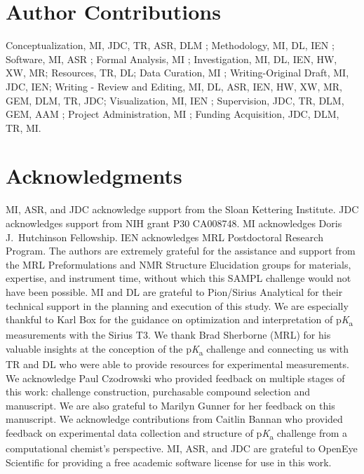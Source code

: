 \documentclass[9pt,lineno]{elife}
\newcommand{\pKa}{p\textit{K}\textsubscript{a}}
\begin{document}
\section{Author Contributions}

Conceptualization, MI, JDC, TR, ASR, DLM  ; Methodology, MI, DL, IEN ; Software, MI, ASR ; Formal Analysis, MI ; Investigation, MI, DL, IEN, HW, XW, MR; Resources, TR, DL;  Data Curation, MI ; Writing-Original Draft, MI, JDC, IEN; Writing - Review and Editing, MI, DL, ASR, IEN, HW, XW, MR, GEM, DLM, TR, JDC; Visualization, MI, IEN ; Supervision, JDC, TR, DLM, GEM, AAM ; Project Administration, MI ; Funding Acquisition, JDC, DLM, TR, MI. 


\section{Acknowledgments}

MI, ASR, and JDC acknowledge support from the Sloan Kettering Institute.
JDC acknowledges support from NIH grant P30 CA008748. 
MI acknowledges Doris J.\ Hutchinson Fellowship. IEN acknowledges MRL Postdoctoral Research Program.
The authors are extremely grateful for the assistance and support from the MRL Preformulations and NMR Structure Elucidation groups for materials, expertise, and instrument time, without which this SAMPL challenge would not have been possible.
MI and DL are grateful to Pion/Sirius Analytical for their technical support in the planning and execution of this study. We are especially thankful to Karl Box for the guidance on optimization and interpretation of \pKa{} measurements with the Sirius T3. 
We thank Brad Sherborne (MRL) for his valuable insights at the conception of the \pKa{} challenge and connecting us with TR and DL who were able to provide resources for experimental measurements. 
We acknowledge Paul Czodrowski who provided feedback on multiple stages of this work: challenge construction, purchasable compound selection and manuscript. 
We are also grateful to Marilyn Gunner for her feedback on this manuscript.
We acknowledge contributions from Caitlin Bannan who provided feedback on experimental data collection and structure of \pKa{} challenge from a computational chemist's perspective. 
MI, ASR, and JDC are grateful to OpenEye Scientific for providing a free academic software license for use in this work.
\end{document}
